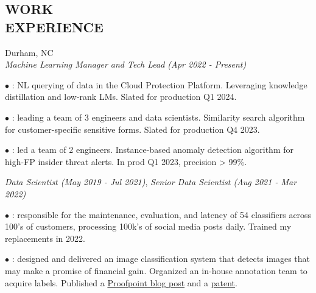 \documentclass[resmargin]{resume_style_class} %
\newenvironment{outline}
  {\begin{list}{}{\setlength{\leftmargin}{30pt}\setlength\itemsep{-2pt}}}
  {\end{list}}
\begin{document}
\begin{resume}

 
\section{WORK \\ EXPERIENCE}
\begin{large}  \end{large} \hfill Durham, NC
\vspace{5pt} \\
\textit{Machine Learning Manager and Tech Lead (Apr 2022 - Present)}
\vspace{2pt}
\begin{outline}
	\item[$\bullet$\hspace{0.1cm}] : NL querying of data in the Cloud Protection Platform. Leveraging knowledge distillation and low-rank LMs. Slated for production Q1 2024.
	\item[$\bullet$\hspace{0.1cm}] : leading a team of 3 engineers and data scientists. Similarity search algorithm for customer-specific sensitive forms. Slated for production Q4 2023.
	\item[$\bullet$\hspace{0.1cm}] : led a team of 2 engineers. Instance-based anomaly detection algorithm for high-FP insider threat alerts. In prod Q1 2023, precision > 99\%.
\end{outline} 
\textit{Data Scientist (May 2019 - Jul 2021)}, \textit{Senior Data Scientist (Aug 2021 - Mar 2022)}
\vspace{2pt}
\begin{outline}
	\item[$\bullet$\hspace{0.1cm}]  : responsible for the maintenance, evaluation, and latency of 54 classifiers across 100's of customers, processing 100k's of social media posts daily. Trained my replacements in 2022.
	\item[$\bullet$\hspace{0.1cm}] : designed and delivered an image classification system that detects images that may make a promise of financial gain. Organized an in-house annotation team to acquire labels. Published a \href{https://www.proofpoint.com/us/blog/engineering-insights/development-of-the-promissory-images-classifier}{Proofpoint blog post} and a \href{https://image-ppubs.uspto.gov/dirsearch-public/print/downloadPdf/11526710}{patent}.

\end{outline}
\end{resume}
\end{document}
